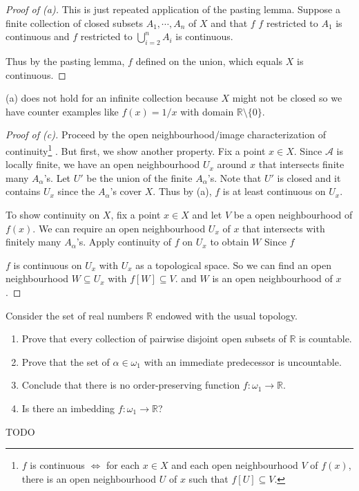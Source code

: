 \documentclass[../../main.tex]{subfiles}
\begin{document}
\begin{proof}[Proof of (a)]
	This is just repeated application of the pasting lemma.
	Suppose a finite collection of closed subsets $A_1, \cdots, A_n$ of $X$ and that $f$
	$f$ restricted to $A_1$ is continuous and
	$f$ restricted to $\bigcup_{i = 2}^n A_i$ is continuous.

	Thus by the pasting lemma, $f$ defined on the union, which equals $X$ is continuous.
\end{proof}

(a) does not hold for an infinite collection because $X$ might not be closed so we have counter examples like $f(x) = 1/x$ with domain $\mathbb{R} \setminus \{0\}$.

\begin{proof}[Proof of (c)]
	Proceed by the open neighbourhood/image characterization of continuity\footnote{$f$ is continuous $\Leftrightarrow$ for each $x \in X$ and each open neighbourhood $V$ of $f(x)$, there is an open neighbourhood $U$ of $x$ such that $f[U] \subseteq V$.}
	.
	But first, we show another property.
	Fix a point $x \in X$.
	Since $\mathscr{A}$ is locally finite, we have an open neighbourhood $U_x$ around $x$ that intersects finite many $A_\alpha$'s.
	Let $U'$ be the union of the finite $A_\alpha$'s.
	Note that $U'$ is closed and it contains $U_x$ since the $A_\alpha$'s cover $X$.
	Thus by (a), $f$ is at least continuous on $U_x$.


	To show continuity on $X$, fix a point $x \in X$ and let $V$ be a open neighbourhood of $f(x)$.
	We can require an open neighbourhood $U_x$ of $x$ that intersects with finitely many $A_\alpha$'s.
	Apply continuity of $f$ on $U_x$ to obtain $W$
	Since $f$

	$f$ is continuous on $U_x$ with $U_x$ as a topological space.
	So we can find an open neighbourhood $W \subseteq U_x$
	with $f[W] \subseteq V$. and $W$ is an open neighbourhood of $x$.
\end{proof}

\begin{problem}[5]
Consider the set of real numbers $\mathbb{R}$ endowed with the usual topology.
\begin{enumerate}[label=(\alph*)]
	\item Prove that every collection of pairwise disjoint open subsets of $\mathbb{R}$ is countable.
	\item Prove that the set of $\alpha\in\omega_1$ with an immediate predecessor is uncountable.
	\item Conclude that there is no order-preserving function $f\colon\omega_1\to\mathbb{R}$.
	\item Is there an imbedding $f\colon\omega_1\to\mathbb{R}$?
\end{enumerate}
\end{problem}
{\huge TODO}
\end{document}
